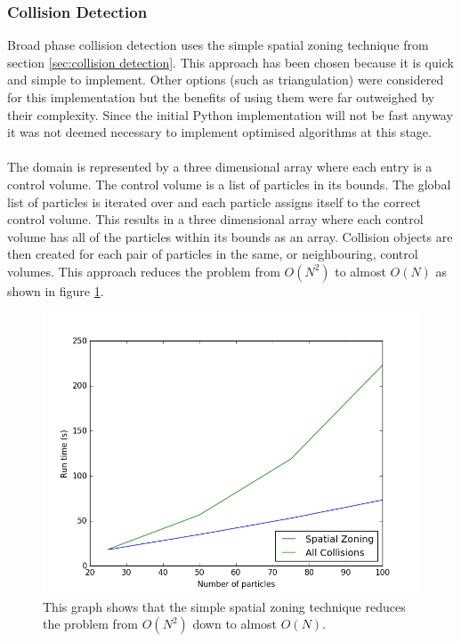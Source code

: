 \documentclass[10pt,a4paper,titlepage]{report}
\begin{document}
\subsubsection{Collision Detection}
\label{sec:Python Collision Detection}
Broad phase collision detection uses the simple spatial zoning technique from section \ref{sec:collision detection}. This approach has been chosen because it is quick and simple to implement. Other options (such as triangulation\cite{dynamictriangulations}) were considered for this implementation but the benefits of using them were far outweighed by their complexity. Since the initial Python implementation will not be fast anyway it was not deemed necessary to implement optimised algorithms at this stage.
\\\\The domain is represented by a three dimensional array where each entry is a control volume. The control volume is a list of particles in its bounds. The global list of particles is iterated over and each particle assigns itself to the correct control volume. This results in a three dimensional array where each control volume has all of the particles within its bounds as an array. Collision objects are then created for each pair of particles in the same, or neighbouring, control volumes. This approach reduces the problem from $O(N^{2})$ to almost $O(N)$ as shown in figure \ref{fig:run_time_against_N_python}.
\begin{figure}[!ht]
\centering
\includegraphics[scale=0.75]{figures/RunTimeAgainstNumberOfParticlesPython.png}
\caption{This graph shows that the simple spatial zoning technique reduces the problem from $O(N^{2})$ down to almost $O(N)$.}
\label{fig:run_time_against_N_python}
\end{figure}
\end{document}
